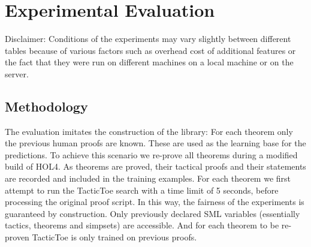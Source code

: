 \documentclass[runningheads,a4paper,draft]{svjour3}
\def\holfour{\textsf{HOL4}\xspace}
\def\sml{\textsf{SML}\xspace}
\def\tactictoe{\textsf{TacticToe}\xspace}
\begin{document}



\section{Experimental Evaluation}\label{s:experiments}

Disclaimer:
Conditions of the experiments may vary slightly between different tables 
because of various factors such 
as overhead cost of additional features or the fact that they were run on 
different machines on a local machine or on the server.

\subsection{Methodology} 

The evaluation imitates the construction of the library: For each theorem only 
the previous human proofs are known. These are used as the learning base for 
the predictions.
To achieve this scenario we re-prove all theorems during a modified build of 
\holfour.
As theorems are proved, their tactical proofs and their statements are recorded 
and included in the 
training examples.
For each theorem we first attempt to run the \tactictoe search with a time 
limit of 5 seconds,
before processing the original proof script.
In this way, the fairness of the
experiments is guaranteed by construction. 
Only previously declared \sml 
variables (essentially tactics, theorems and simpsets) are accessible. 
And for each theorem to be re-proven \tactictoe is only trained on previous 
proofs.
\end{document}
